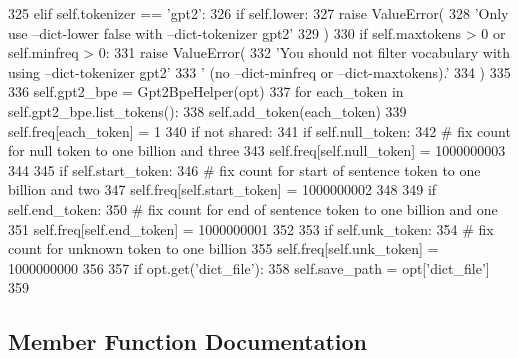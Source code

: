\begin{DoxyCode}
325         \textcolor{keywordflow}{elif} self.tokenizer == \textcolor{stringliteral}{'gpt2'}:
326             \textcolor{keywordflow}{if} self.lower:
327                 \textcolor{keywordflow}{raise} ValueError(
328                     \textcolor{stringliteral}{'Only use --dict-lower false with --dict-tokenizer gpt2'}
329                 )
330             \textcolor{keywordflow}{if} self.maxtokens > 0 \textcolor{keywordflow}{or} self.minfreq > 0:
331                 \textcolor{keywordflow}{raise} ValueError(
332                     \textcolor{stringliteral}{'You should not filter vocabulary with using --dict-tokenizer gpt2'}
333                     \textcolor{stringliteral}{' (no --dict-minfreq or --dict-maxtokens).'}
334                 )
335 
336             self.gpt2\_bpe = Gpt2BpeHelper(opt)
337             \textcolor{keywordflow}{for} each\_token \textcolor{keywordflow}{in} self.gpt2\_bpe.list\_tokens():
338                 self.add\_token(each\_token)
339                 self.freq[each\_token] = 1
340         \textcolor{keywordflow}{if} \textcolor{keywordflow}{not} shared:
341             \textcolor{keywordflow}{if} self.null\_token:
342                 \textcolor{comment}{# fix count for null token to one billion and three}
343                 self.freq[self.null\_token] = 1000000003
344 
345             \textcolor{keywordflow}{if} self.start\_token:
346                 \textcolor{comment}{# fix count for start of sentence token to one billion and two}
347                 self.freq[self.start\_token] = 1000000002
348 
349             \textcolor{keywordflow}{if} self.end\_token:
350                 \textcolor{comment}{# fix count for end of sentence token to one billion and one}
351                 self.freq[self.end\_token] = 1000000001
352 
353             \textcolor{keywordflow}{if} self.unk\_token:
354                 \textcolor{comment}{# fix count for unknown token to one billion}
355                 self.freq[self.unk\_token] = 1000000000
356 
357             \textcolor{keywordflow}{if} opt.get(\textcolor{stringliteral}{'dict\_file'}):
358                 self.save\_path = opt[\textcolor{stringliteral}{'dict\_file'}]
359 
\end{DoxyCode}


\subsection{Member Function Documentation}
\mbox{\label{classparlai_1_1core_1_1dict_1_1DictionaryAgent_a29f4181dcdd5f53103bc342bf5f3c74a}} 
